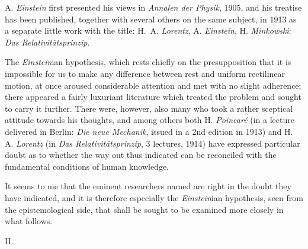 \documentclass[12pt,a4paper]{article}
\begin{document}
A. \emph{Einstein} first presented his views in \emph{Annalen der Physik},
1905, and his treatise has been published, together with several others on the
same subject, in 1913 as a separate little work with the title: H.\ A.
\emph{Lorentz}, A. \emph{Einstein}, H. \emph{Minkowski}: \emph{Das
Relativitätsprinzip}.

The \emph{Einstein}ian hypothesis, which rests chiefly on the presupposition
that it is impossible for us to make any difference between rest and uniform
rectilinear motion, at once aroused considerable attention and met with no
slight adherence; there appeared a fairly luxuriant literature which treated
the problem and sought to carry it further. There were, however, also many who
took a rather sceptical attitude towards his thoughts, and among others both
H. \emph{Poincaré} (in a lecture delivered in Berlin: \emph{Die neue
Mechanik}, issued in a 2nd edition in 1913) and H. A. \emph{Lorentz} (in
\emph{Das Relativitätsprinzip}, 3 lectures, 1914) have expressed particular
doubt as to whether the way out thus indicated can be reconciled with the
fundamental conditions of human knowledge.

It seems to me that the eminent researchers named are right in the doubt they
have indicated, and it is therefore especially the \emph{Einstein}ian
hypothesis, seen from the epistemological side, that shall be sought to be
examined more closely in what follows.

\begin{center}
II.
\end{center}
\end{document}
